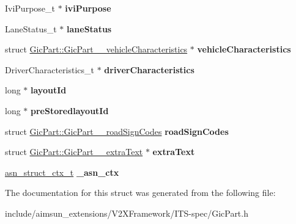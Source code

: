 \begin{DoxyCompactItemize}
\item 
Ivi\+Purpose\+\_\+t $\ast$ {\bfseries ivi\+Purpose}\hypertarget{structGicPart_ac71ff75fdd44348318f83698caad5cc0}{}\label{structGicPart_ac71ff75fdd44348318f83698caad5cc0}

\item 
Lane\+Status\+\_\+t $\ast$ {\bfseries lane\+Status}\hypertarget{structGicPart_aa7756fa2fb61b41036713ec74f736c33}{}\label{structGicPart_aa7756fa2fb61b41036713ec74f736c33}

\item 
struct \hyperlink{structGicPart_1_1GicPart____vehicleCharacteristics}{Gic\+Part\+::\+Gic\+Part\+\_\+\+\_\+vehicle\+Characteristics} $\ast$ {\bfseries vehicle\+Characteristics}\hypertarget{structGicPart_a3d77ea5955132f4c08f7d681a37ccd76}{}\label{structGicPart_a3d77ea5955132f4c08f7d681a37ccd76}

\item 
Driver\+Characteristics\+\_\+t $\ast$ {\bfseries driver\+Characteristics}\hypertarget{structGicPart_a97af18cea82200abc77468da0f32799b}{}\label{structGicPart_a97af18cea82200abc77468da0f32799b}

\item 
long $\ast$ {\bfseries layout\+Id}\hypertarget{structGicPart_ae8b7fafeaab463e57a417039eda991c1}{}\label{structGicPart_ae8b7fafeaab463e57a417039eda991c1}

\item 
long $\ast$ {\bfseries pre\+Storedlayout\+Id}\hypertarget{structGicPart_af16a7a5d66ccc0651adc2322281bb56d}{}\label{structGicPart_af16a7a5d66ccc0651adc2322281bb56d}

\item 
struct \hyperlink{structGicPart_1_1GicPart____roadSignCodes}{Gic\+Part\+::\+Gic\+Part\+\_\+\+\_\+road\+Sign\+Codes} {\bfseries road\+Sign\+Codes}\hypertarget{structGicPart_a411fa551272b07ed1cefb9b52b9fef02}{}\label{structGicPart_a411fa551272b07ed1cefb9b52b9fef02}

\item 
struct \hyperlink{structGicPart_1_1GicPart____extraText}{Gic\+Part\+::\+Gic\+Part\+\_\+\+\_\+extra\+Text} $\ast$ {\bfseries extra\+Text}\hypertarget{structGicPart_a13ecb7be66e066e39886586eee201736}{}\label{structGicPart_a13ecb7be66e066e39886586eee201736}

\item 
\hyperlink{structasn__struct__ctx__s}{asn\+\_\+struct\+\_\+ctx\+\_\+t} {\bfseries \+\_\+asn\+\_\+ctx}\hypertarget{structGicPart_a3e29746c3fa56a55415f2e7d3681c4e9}{}\label{structGicPart_a3e29746c3fa56a55415f2e7d3681c4e9}

\end{DoxyCompactItemize}


The documentation for this struct was generated from the following file\+:\begin{DoxyCompactItemize}
\item 
include/aimsun\+\_\+extensions/\+V2\+X\+Framework/\+I\+T\+S-\/spec/Gic\+Part.\+h\end{DoxyCompactItemize}

